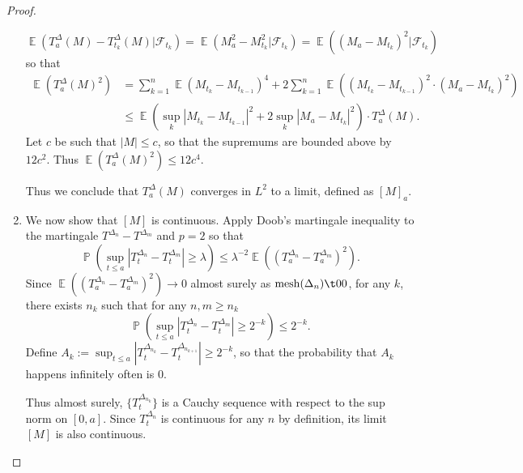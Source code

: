 \documentclass[11pt, a4paper]{memoir}
\theoremstyle{change}
\theoremstyle{plain}
\theoremstyle{nonumberplain}
\newtheorem{proof}{Proof}
\DeclareMathOperator{\pr}{{\mathbb{P}}}
\DeclareMathOperator{\E}{{\mathbb{E}}}
\DeclareMathOperator{\mesh}{mesh}
\numberwithin{equation}{section}
\begin{document}
\begin{proof}
\begin{enumerate}[nl]
\begin{equation*}
                \E(T_a^\Delta(M)-T_{t_k}^\Delta(M)|\mathcal{F}_{t_k}) = \E(M_a^2-M_{t_k}^2|\mathcal{F}_{t_k}) = \E((M_a-M_{t_k})^2|\mathcal{F}_{t_k})
            \end{equation*}
            so that
            \begin{align*}
                \E(T_a^\Delta(M)^2) &= \sum_{k=1}^n\E(M_{t_k}-M_{t_{k-1}})^4+2\sum_{k=1}^n\E((M_{t_k}-M_{t_{k-1}})^2\cdot(M_a-M_{t_k})^2)\\
                                    &\leq\E\left(\sup_k|M_{t_k}-M_{t_{k-1}}|^2+2\sup_k|M_a-M_{t_k}|^2\right)\cdot T_a^\Delta(M).
            \end{align*}
            Let $c$ be such that $|M|\leq c$, so that the supremums are bounded above by $12c^2$.
            Thus $\E(T_a^\Delta(M)^2)\leq 12c^4$.

            Thus we conclude that $T_a^\Delta(M)$ converges in $L^2$ to a limit, defined as $[M]_a$.
        \item We now show that $[M]$ is continuous.
            Apply Doob's martingale inequality to the martingale $T^{\Delta_n}-T^{\Delta_m}$ and $p=2$ so that
            \begin{equation*}
                \pr(\sup_{t\leq a}|T_t^{\Delta_n}-T_t^{\Delta_m}|\geq\lambda)\leq\lambda^{-2}\E((T_a^{\Delta_n}-T_a^{\Delta_m})^2).
            \end{equation*}
            Since $\E((T_a^{\Delta_n}-T_a^{\Delta_m})^2)\to 0$ almost surely as $\mesh(\Delta_n)\t0 0$, for any $k$, there exists $n_k$ such that for any $n,m\geq n_k$
            \begin{equation*}
                \pr(\sup_{t\leq a}|T_t^{\Delta_n}-T_t^{\Delta_m}|\geq 2^{-k})\leq 2^{-k}.
            \end{equation*}
            Define $A_k:=\sup_{t\leq a}|T_t^{\Delta_{n_k}}-T_t^{\Delta_{n_{k+1}}}|\geq 2^{-k}$, so that the probability that $A_k$ happens infinitely often is 0.

            Thus almost surely, $\{T_t^{\Delta_{n_k}}\}$ is a Cauchy sequence with respect to the sup norm on $[0,a]$.
            Since $T_t^{\Delta_n}$ is continuous for any $n$ by definition, its limit $[M]$ is also continuous.
    \end{enumerate}
\end{proof}
\end{document}
